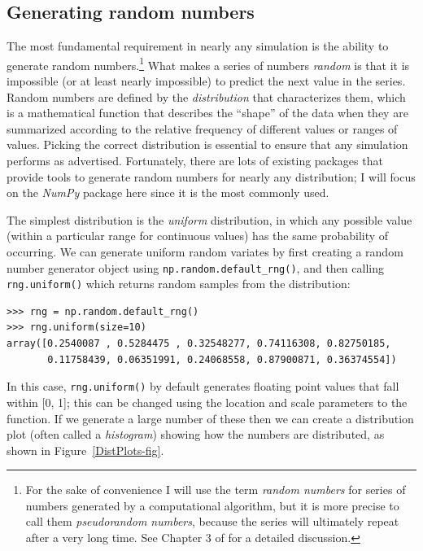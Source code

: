 \subsection{Generating random numbers}

The most fundamental requirement in nearly any simulation is the ability to generate random numbers.\footnote{For the sake of convenience I will use the term \textit{random numbers} for series of numbers generated by a computational algorithm, but it is more precise to call them \textit{pseudorandom numbers}, because the series will ultimately repeat after a very long time.  See Chapter 3 of \cite{Knuth:1981aa} for a detailed discussion.} What makes a series of numbers \textit{random} is that it is impossible (or at least nearly impossible) to predict the next value in the series.  Random numbers are defined by the \textit{distribution} that characterizes them, which is a mathematical function that describes the ``shape'' of the data when they are summarized according to the relative frequency of different values or ranges of values.  Picking the correct distribution is essential to ensure that any simulation performs as advertised.  Fortunately, there are lots of existing packages that provide tools to generate random numbers for nearly any distribution; I will focus on the \textit{NumPy} package here since it is the most commonly used.

The simplest distribution is the \textit{uniform} distribution, in which any possible value (within a particular range for continuous values) has the same probability of occurring.  We can generate uniform random variates by first creating a random number generator object using \texttt{np.random.default\_rng()}, and then calling \texttt{rng.uniform()} which returns random samples from the distribution:

\begin{lstlisting}[style=replshort]
>>> rng = np.random.default_rng()
>>> rng.uniform(size=10)
array([0.2540087 , 0.5284475 , 0.32548277, 0.74116308, 0.82750185,
       0.11758439, 0.06351991, 0.24068558, 0.87900871, 0.36374554])
\end{lstlisting}

In this case, \texttt{rng.uniform()} by default generates floating point values that fall within [0, 1]; this can be changed using the location and scale parameters to the function.  If we generate a large number of these then we can create a distribution plot (often called a \textit{histogram}) showing how the numbers are distributed, as shown in Figure~\ref{DistPlots-fig}.

